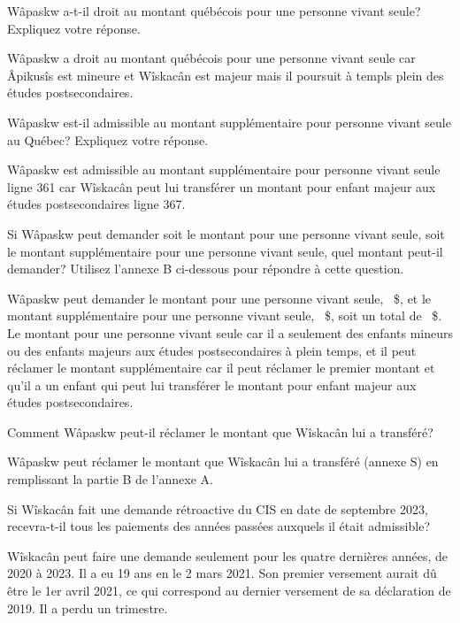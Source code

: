 \begin{question}
	Wâpaskw a-t-il droit au montant québécois pour une personne vivant seule? Expliquez votre réponse.
\end{question}
Wâpaskw a droit au montant québécois pour une personne vivant seule car Âpikusîs est mineure et Wîskacân est majeur mais il poursuit à templs plein des études postsecondaires.

\begin{question}
	Wâpaskw est-il admissible au montant supplémentaire pour personne vivant seule au Québec? Expliquez votre réponse.
\end{question}
Wâpaskw est admissible au montant supplémentaire pour personne vivant seule ligne 361 car Wîskacân peut lui transférer un montant pour enfant majeur aux études postsecondaires ligne 367.

\begin{question}
	Si Wâpaskw peut demander soit le montant pour une personne vivant seule, soit le montant supplémentaire pour une personne vivant seule, quel montant peut-il demander? Utilisez l'annexe B ci-dessous pour répondre à cette question.
\end{question}
Wâpaskw peut demander le montant pour une personne vivant seule, ~\$, et le montant supplémentaire pour une personne vivant seule, ~\$, soit un total de ~\$. Le montant pour une personne vivant seule car il a seulement des enfants mineurs ou des enfants majeurs aux études postsecondaires à plein temps, et il peut réclamer le montant supplémentaire car il peut réclamer le premier montant et qu'il a un enfant qui peut lui transférer le montant pour enfant majeur aux études postsecondaires.

\begin{question}
	Comment Wâpaskw peut-il réclamer le montant que Wîskacân lui a transféré?
\end{question}
Wâpaskw peut réclamer le montant que Wîskacân lui a transféré (annexe S) en remplissant la partie B de l'annexe A.

\begin{question}
	Si Wîskacân fait une demande rétroactive du CIS en date de septembre 2023, recevra-t-il tous les paiements des années passées auxquels il était admissible?
\end{question}
Wîskacân peut faire une demande seulement pour les quatre dernières années, de 2020 à 2023. Il a eu 19 ans en le 2 mars 2021. Son premier versement aurait dû être le 1er avril 2021, ce qui correspond au dernier versement de sa déclaration de 2019. Il a perdu un trimestre.